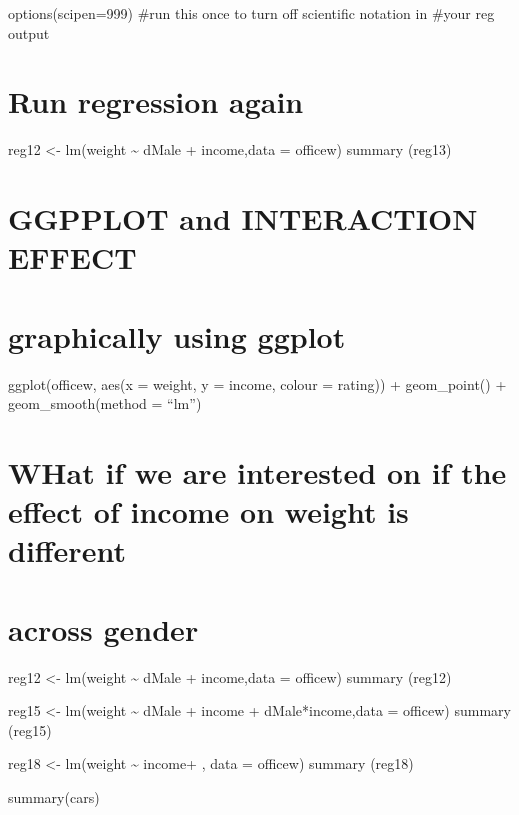 \documentclass[
]{article}
\newenvironment{Shaded}{\begin{snugshade}}{\end{snugshade}}
\newcommand{\FunctionTok}[1]{\textcolor[rgb]{0.00,0.00,0.00}{#1}}
\newcommand{\NormalTok}[1]{#1}
\begin{document}
options(scipen=999) \#run this once to turn off scientific notation in
\#your reg output

\hypertarget{run-regression-again}{%
\section{Run regression again}\label{run-regression-again}}

reg12 \textless- lm(weight \textasciitilde{} dMale + income,data =
officew) summary (reg13)

\hypertarget{ggpplot-and-interaction-effect}{%
\section{GGPPLOT and INTERACTION
EFFECT}\label{ggpplot-and-interaction-effect}}

\hypertarget{graphically-using-ggplot}{%
\section{graphically using ggplot}\label{graphically-using-ggplot}}

ggplot(officew, aes(x = weight, y = income, colour = rating)) +
geom\_point() + geom\_smooth(method = ``lm'')

\hypertarget{what-if-we-are-interested-on-if-the-effect-of-income-on-weight-is-different}{%
\section{WHat if we are interested on if the effect of income on weight
is
different}\label{what-if-we-are-interested-on-if-the-effect-of-income-on-weight-is-different}}

\hypertarget{across-gender}{%
\section{across gender}\label{across-gender}}

reg12 \textless- lm(weight \textasciitilde{} dMale + income,data =
officew) summary (reg12)

reg15 \textless- lm(weight \textasciitilde{} dMale + income +
dMale*income,data = officew) summary (reg15)

reg18 \textless- lm(weight \textasciitilde{} income+ , data = officew)
summary (reg18)

\begin{Shaded}
\begin{Highlighting}[]
\FunctionTok{summary}\NormalTok{(cars)}
\end{Highlighting}
\end{Shaded}
\end{document}
